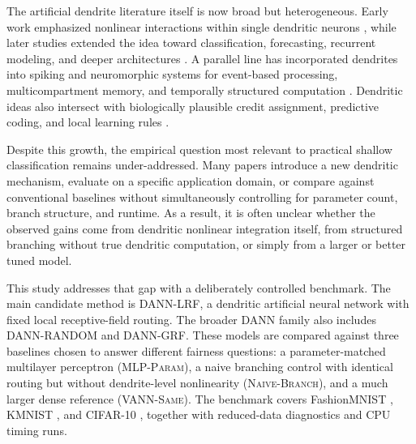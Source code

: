 \documentclass[preprint,12pt]{elsarticle}
\newcommand{\DANNLRF}{\textsc{DANN-LRF}}
\newcommand{\DANNRANDOM}{\textsc{DANN-RANDOM}}
\newcommand{\DANNGRF}{\textsc{DANN-GRF}}
\newcommand{\NAIVEBRANCH}{\textsc{Naive-Branch}}
\newcommand{\MLPPARAM}{\textsc{MLP-Param}}
\newcommand{\VANNSAME}{\textsc{VANN-Same}}
\begin{document}
The artificial dendrite literature itself is now broad but heterogeneous. Early work emphasized nonlinear interactions within single dendritic neurons \cite{todo2014unsupervised,gao2019dendritic,wu2018expressivity,qian2019mr2dnm,wang2020adaptive,wang2020median}, while later studies extended the idea toward classification, forecasting, recurrent modeling, and deeper architectures \cite{tang2021aisdnm,ji2021wind,jia2022verification,song2022logic,egrioglu2022recurrent,yilmaz2023robust,tomov2023madnn,ozkirimli2023bootstrapped,yuan2023pm25,tang2024dnn,egrioglu2024deepdann,li2024alternating,liu2024capturecorr,gao2023complex}. A parallel line has incorporated dendrites into spiking and neuromorphic systems for event-based processing, multicompartment memory, and temporally structured computation \cite{yang2021event,yang2022sam,gao2022multicompartment,pagkalos2023dendrify,zheng2024temporal,dagostino2024denram,baek2024silent,liu2024graphene,cardwell2025leveraging}. Dendritic ideas also intersect with biologically plausible credit assignment, predictive coding, and local learning rules \cite{guerguiev2017segregated,lansdell2019credit,kunin2020tworoutes,millidge2020relaxing,meulemans2021deepfeedback,dalm2021targetprop,chen2022creditnet,tang2023predictive,millidge2024temporal,lv2025localized,sarfraz2023continual}.

Despite this growth, the empirical question most relevant to practical shallow classification remains under-addressed. Many papers introduce a new dendritic mechanism, evaluate on a specific application domain, or compare against conventional baselines without simultaneously controlling for parameter count, branch structure, and runtime. As a result, it is often unclear whether the observed gains come from dendritic nonlinear integration itself, from structured branching without true dendritic computation, or simply from a larger or better tuned model.

This study addresses that gap with a deliberately controlled benchmark. The main candidate method is \DANNLRF{}, a dendritic artificial neural network with fixed local receptive-field routing. The broader DANN family also includes \DANNRANDOM{} and \DANNGRF{}. These models are compared against three baselines chosen to answer different fairness questions: a parameter-matched multilayer perceptron (\MLPPARAM{}), a naive branching control with identical routing but without dendrite-level nonlinearity (\NAIVEBRANCH{}), and a much larger dense reference (\VANNSAME{}). The benchmark covers FashionMNIST \cite{xiao2017fashion}, KMNIST \cite{clanuwat2018kmnist}, and CIFAR-10 \cite{krizhevsky2009cifar}, together with reduced-data diagnostics and CPU timing runs.
\end{document}
